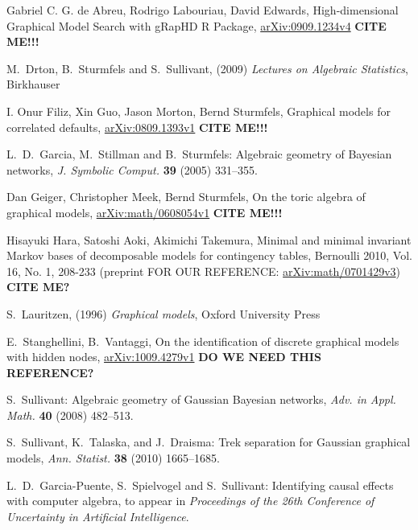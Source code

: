 \documentclass{article}
\theoremstyle{definition}
\begin{document}
\begin{thebibliography}{2}

Gabriel C. G. de Abreu, Rodrigo Labouriau, David Edwards, High-dimensional Graphical Model Search with gRapHD R Package, \href{http://arxiv.org/abs/0909.1234}{arXiv:0909.1234v4}
{\bf CITE ME!!!}

M.~Drton, B.~Sturmfels and S.~Sullivant, (2009) \emph{Lectures on Algebraic Statistics}, Birkhauser 

I. Onur Filiz, Xin Guo, Jason Morton, Bernd Sturmfels, Graphical models for correlated defaults, \href{http://arxiv.org/abs/0809.1393}{arXiv:0809.1393v1}
{\bf CITE ME!!!}

 L.~D.~Garcia, M.~Stillman and B.~Sturmfels: Algebraic geometry of Bayesian networks, {\em J. Symbolic Comput.}
  {\bf 39} (2005) 331--355.
  
Dan Geiger, Christopher Meek, Bernd Sturmfels, On the toric algebra of graphical models, \href{http://arxiv.org/abs/math/0608054}{arXiv:math/0608054v1}
{\bf CITE ME!!!}

Hisayuki Hara, Satoshi Aoki, Akimichi Takemura, Minimal and minimal invariant Markov bases of decomposable models for contingency tables, Bernoulli 2010, Vol. 16, No. 1, 208-233  (preprint FOR OUR REFERENCE: \href{http://arxiv.org/abs/math/0701429}{arXiv:math/0701429v3})
{\bf CITE ME?}

S.~Lauritzen,  (1996) \emph{Graphical models}, Oxford University Press

E.~Stanghellini, B.~Vantaggi, On the identification of discrete graphical models with hidden nodes, \href{http://arxiv.org/abs/1009.4279}{	arXiv:1009.4279v1}
{\bf DO WE NEED THIS REFERENCE?}

 S.~Sullivant: Algebraic geometry of Gaussian Bayesian
  networks, {\em Adv. in Appl. Math.} {\bf 40} (2008) 482--513.

S.~Sullivant, K.~Talaska, and J.~Draisma: Trek separation for Gaussian
graphical models, {\em Ann. Statist.} {\bf 38} (2010) 1665--1685. 

 L.~D.~Garcia-Puente, S.~Spielvogel and S.~Sullivant: Identifying
causal effects with computer algebra, to appear in {\em Proceedings of the 26th
Conference of Uncertainty in Artificial Intelligence}.

\end{thebibliography}
\end{document}
